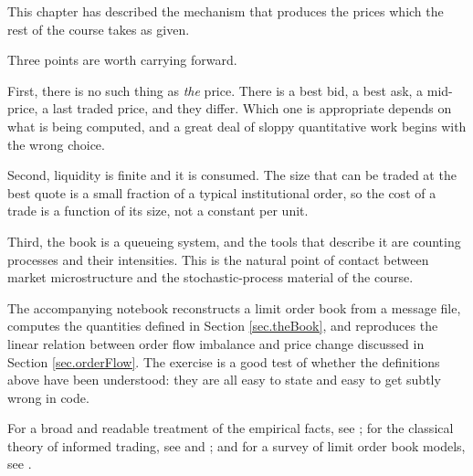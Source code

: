 This chapter has described the mechanism that produces the prices
which the rest of the course takes as given.

Three points are worth carrying forward.

First,
there is no such thing as \emph{the} price.
There is a best bid, a best ask, a mid-price, a last traded price,
and they differ.
Which one is appropriate depends on what is being computed,
and a great deal of sloppy quantitative work begins with the wrong choice.

Second,
liquidity is finite and it is consumed.
The size that can be traded at the best quote is a small fraction of a typical
institutional order,
so the cost of a trade is a function of its size,
not a constant per unit.

Third,
the book is a queueing system,
and the tools that describe it are counting processes and their intensities.
This is the natural point of contact between market microstructure and
the stochastic-process material of the course.

The accompanying notebook reconstructs a limit order book from a message file,
computes the quantities defined in Section \ref{sec.theBook},
and reproduces the linear relation between order flow imbalance and price change
discussed in Section \ref{sec.orderFlow}.
The exercise is a good test of whether the definitions above have been understood:
they are all easy to state and easy to get subtly wrong in code.

For a broad and readable treatment of the empirical facts, see \cite{Bou18tra};
for the classical theory of informed trading, see \cite{Kyl85con} and \cite{GM85bid};
and for a survey of limit order book models, see \cite{GPFA13lim}.
